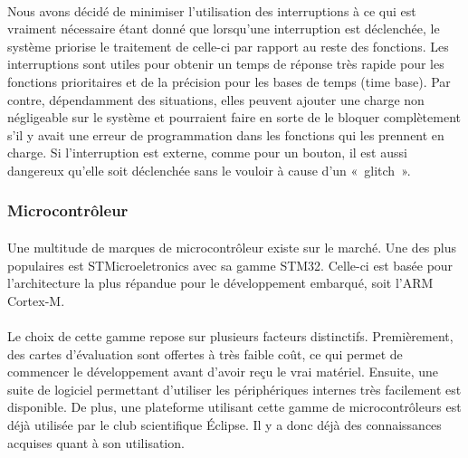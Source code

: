 		\paragraph*{}
		Nous avons décidé de minimiser l’utilisation des interruptions à ce qui est vraiment nécessaire étant donné que lorsqu’une interruption est déclenchée, le système priorise le traitement de celle-ci par rapport au reste des fonctions. Les interruptions sont utiles pour obtenir un temps de réponse très rapide pour les fonctions prioritaires et de la précision pour les bases de temps (time base). Par contre, dépendamment des situations, elles peuvent ajouter une charge non négligeable sur le système et pourraient faire en sorte de le bloquer complètement s’il y avait une erreur de programmation dans les fonctions qui les prennent en charge. Si l’interruption est externe, comme pour un bouton, il est aussi dangereux qu’elle soit déclenchée sans le vouloir à cause d’un « glitch ».

	\subsubsection{Microcontrôleur}
		\paragraph*{}
		Une multitude de marques de microcontrôleur existe sur le marché. Une des plus populaires est STMicroeletronics avec sa gamme STM32. Celle-ci est basée pour l’architecture la plus répandue pour le développement embarqué, soit l’ARM Cortex-M.

		\paragraph*{}
		Le choix de cette gamme repose sur plusieurs facteurs distinctifs. Premièrement, des cartes d’évaluation sont offertes à très faible coût, ce qui permet de commencer le développement avant d’avoir reçu le vrai matériel. Ensuite, une suite de logiciel permettant d’utiliser les périphériques internes très facilement est disponible. De plus, une plateforme utilisant cette gamme de microcontrôleurs est déjà utilisée par le club scientifique Éclipse. Il y a donc déjà des connaissances acquises quant à son utilisation.
